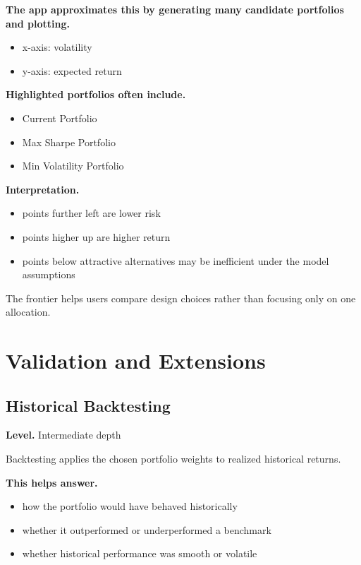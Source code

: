 \documentclass[11pt]{report}
\begin{document}
\textbf{The app approximates this by generating many candidate portfolios and plotting.}

\begin{itemize}
\item x-axis: volatility
\item y-axis: expected return
\end{itemize}

\textbf{Highlighted portfolios often include.}

\begin{itemize}
\item Current Portfolio
\item Max Sharpe Portfolio
\item Min Volatility Portfolio
\end{itemize}

\textbf{Interpretation.}

\begin{itemize}
\item points further left are lower risk
\item points higher up are higher return
\item points below attractive alternatives may be inefficient under the model assumptions
\end{itemize}

The frontier helps users compare design choices rather than focusing only on one allocation.

\chapter{Validation and Extensions}

\section{Historical Backtesting}
\begin{callout}
\textbf{Level.} Intermediate depth
\end{callout}

Backtesting applies the chosen portfolio weights to realized historical returns.

\textbf{This helps answer.}

\begin{itemize}
\item how the portfolio would have behaved historically
\item whether it outperformed or underperformed a benchmark
\item whether historical performance was smooth or volatile
\end{itemize}
\end{document}
